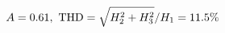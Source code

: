 \documentclass[preview]{standalone}
\begin{document}
\begin{align*}
\special{dvisvgm:raw <g id='unique000'>}A=0.61,\ \text{THD}=\sqrt{H_2^2+H_3^2}/H_1=11.5\%\special{dvisvgm:raw </g>}
\end{align*}
\end{document}
